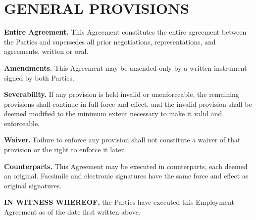 \section{GENERAL PROVISIONS}

\parsp
\textbf{Entire Agreement.} This Agreement constitutes the entire agreement between the Parties and supersedes all prior negotiations, representations, and agreements, written or oral.

\parsp
\textbf{Amendments.} This Agreement may be amended only by a written instrument signed by both Parties.

\parsp
\textbf{Severability.} If any provision is held invalid or unenforceable, the remaining provisions shall continue in full force and effect, and the invalid provision shall be deemed modified to the minimum extent necessary to make it valid and enforceable.

\parsp
\textbf{Waiver.} Failure to enforce any provision shall not constitute a waiver of that provision or the right to enforce it later.

\parsp
\textbf{Counterparts.} This Agreement may be executed in counterparts, each deemed an original. Facsimile and electronic signatures have the same force and effect as original signatures.

\vspace{22pt}

{\color{accent}\titlerule[0.5pt]}
\vspace{6pt}
{\large\bfseries\color{accent}IN WITNESS WHEREOF,} the Parties have executed this Employment Agreement as of the date first written above.

\vspace{26pt}

\noindent
{}
\hfill
{}

\vspace{16pt}

\noindent
{}
\hfill
{}
